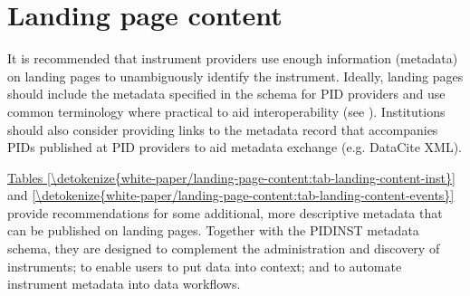 \documentclass[a4paper,10pt,english]{sphinxmanual}
\begin{document}
\section{Landing page content}
\label{\detokenize{white-paper/landing-page-content:landing-page-content}}\label{\detokenize{white-paper/landing-page-content:id1}}\label{\detokenize{white-paper/landing-page-content::doc}}
\sphinxAtStartPar
It is recommended that instrument providers use enough information
(metadata) on landing pages to unambiguously identify the instrument.
Ideally, landing pages should include the metadata specified in the
schema for PID providers and use common terminology where practical to
aid interoperability (see {\hyperref[\detokenize{white-paper/metadata-schema-recommendations:pidinst-metadata-schema-terminologies}]{}}).
Institutions should also consider providing links to the metadata record
that accompanies PIDs published at PID providers to aid metadata
exchange (e.g. DataCite XML).

\sphinxAtStartPar
\hyperref[\detokenize{white-paper/landing-page-content:tab-landing-content-inst}]{Tables \ref{\detokenize{white-paper/landing-page-content:tab-landing-content-inst}}} and
\hyperref[\detokenize{white-paper/landing-page-content:tab-landing-content-events}]{\ref{\detokenize{white-paper/landing-page-content:tab-landing-content-events}}} provide recommendations for
some additional, more descriptive metadata that can be published on
landing pages. Together with the PIDINST metadata schema, they are
designed to complement the administration and discovery of
instruments; to enable users to put data into context; and to automate
instrument metadata into data workflows.
\end{document}
